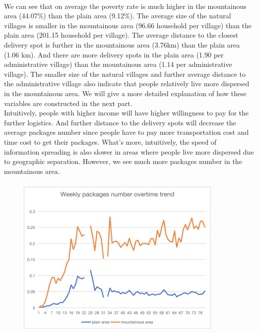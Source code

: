 \documentclass{article}
\begin{document}
\paragraph{ \newline}
\mbox{\hspace{2em}}
We can see that on average the poverty rate is much higher in the mountainous area (44.07\%) than the plain area (9.12\%). The average size of the natural villages is smaller in the mountainous area (96.66 household per village) than the plain area (201.15 household per village). The average distance to the closest delivery spot is further in the mountainous area (3.76km) than the plain area (1.06 km). And there are more delivery spots in the plain area (1.90 per administrative village) than the mountainous area (1.14 per administrative village). The smaller size of the natural villages and further average distance to the administrative village also indicate that people relatively live more dispersed in the mountainous area. We will give a more detailed explanation of how these variables are constructed in the next part.\\
\mbox{\hspace{2em}}  
Intuitively, people with higher income will have higher willingness to pay for the further logistics. And further distance to the delivery spots will decrease the average packages number since people have to pay more transportation cost and time cost to get their packages. What’s more, intuitively, the speed of information spreading is also slower in areas where people live more dispersed due to geographic separation. However, we see much more packages number in the mountainous area. \\   
\begin{figure}[H]                                        
    \centering                                                
    \includegraphics[width=10cm,height=8cm]{over-time.png}                                                                                         
\end{figure}                                             
\end{document}
